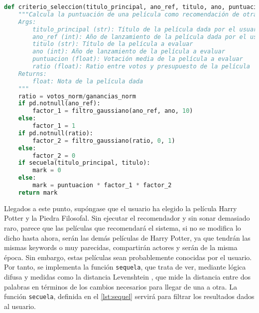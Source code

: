 \begin{lstlisting}[language=Python, caption= {Criterios de selección para la elección de las mejores películas. Se parte de la puntuación de la película y se modifica según la proximidad temporal de la película a evaluar con la película de referencia y el ratio entre votos e ingresos de la película. El objetivo de esto es introducir una heurística que permita ordenar las recomendaciones basadas en contenido de acuerdo con lo que se prevé que preferira el usuario. Se puntuan mejor películas más cercanas a la dada por el usuario y que tengan muchos votos en relación con sus ingresos.}, label={lst:criteria}]
def criterio_seleccion(titulo_principal, ano_ref, titulo, ano, puntuacion, votos_norm, ganancias_norm):
    """Calcula la puntuación de una película como recomendación de otra en base a la similaridad de su título, la distancia temporal entre ambos lanzamientos y el número de votos de la película evaluada y la puntuación de la película. Además, la similitud entre títulos se tiene en cuenta para evitar la recomendación de secuelas. Es decir, si dos películas tienen un nombre muy similar, se desechara como recomendación.
    Args:
        titulo_principal (str): Título de la película dada por el usuario
        ano_ref (int): Año de lanzamiento de la película dada por el usuario
        titulo (str): Título de la película a evaluar
        ano (int): Año de lanzamiento de la película a evaluar
        puntuacion (float): Votación media de la película a evaluar
        ratio (float): Ratio entre votos y presupuesto de la película
    Returns:
        float: Nota de la película dada
    """
    ratio = votos_norm/ganancias_norm
    if pd.notnull(ano_ref):
        factor_1 = filtro_gaussiano(ano_ref, ano, 10)
    else:
        factor_1 = 1        
    if pd.notnull(ratio):
        factor_2 = filtro_gaussiano(ratio, 0, 1)
    else:
        factor_2 = 0
    if secuela(titulo_principal, titulo):
        mark = 0
    else:
        mark = puntuacion * factor_1 * factor_2
    return mark
\end{lstlisting}

Llegados a este punto, supóngase que el usuario ha elegido la película Harry Potter y la Piedra Filosofal. Sin ejecutar el recomendador y sin sonar demasiado raro, parece que las películas que recomendará el sistema, si no se modifica lo dicho hasta ahora, serán las demás películas de Harry Potter, ya que tendrán las mismas keywords o muy parecidas, compartirán actores y serán de la misma época. Sin embargo, estas películas sean probablemente conocidas por el usuario. Por tanto, se implementa la función \texttt{sequela}, que trata de ver, mediante lógica difusa y medidas como la distancia Levenshtein \cite{levenshtein}, que mide la distancia entre dos palabras en términos de los cambios necesarios para llegar de una a otra. La función \texttt{secuela}, definida en el \autoref{lst:sequel} servirá para filtrar los resultados dados al usuario.

